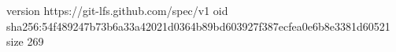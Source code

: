 version https://git-lfs.github.com/spec/v1
oid sha256:54f489247b73b6a33a42021d0364b89bd603927f387ecfea0e6b8e3381d60521
size 269
